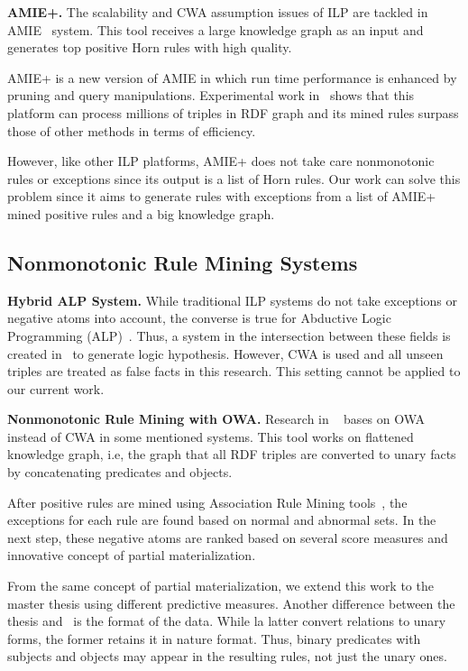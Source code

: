 \textbf{AMIE+.} The scalability and CWA assumption issues of ILP are tackled in AMIE~\cite{ref10} system. This tool receives a large knowledge graph as an input and generates top positive Horn rules with high quality.

AMIE+ is a new version of AMIE in which run time performance is enhanced by pruning and query manipulations. Experimental work in~\cite{ref10} shows that this platform can process millions of triples in RDF graph and its mined rules surpass those of other methods in terms of efficiency.

However, like other ILP platforms, AMIE+ does not take care nonmonotonic rules or exceptions since its output is a list of Horn rules. Our work can solve this problem since it aims to generate rules with exceptions from a list of AMIE+ mined positive rules and a big knowledge graph.

\subsection{Nonmonotonic Rule Mining Systems}
\label{related-work-nonmonotonic-rule-mining-systems}

\textbf{Hybrid ALP System.} While traditional ILP systems do not take exceptions or negative atoms into account, the converse is true for Abductive Logic Programming (ALP)~\cite{ref11}. Thus, a system in the intersection between these fields is created in~\cite{ref11} to generate logic hypothesis. However, CWA is used and all unseen triples are treated as false facts in this research. This setting cannot be applied to our current work.

\textbf{Nonmonotonic Rule Mining with OWA.} Research in ~\cite{ref12} bases on OWA instead of CWA in some mentioned systems. This tool works on flattened knowledge graph, i.e, the graph that all RDF triples are converted to unary facts by concatenating predicates and objects.

After positive rules are mined using Association Rule Mining tools~\cite{ref13}, the exceptions for each rule are found based on normal and abnormal sets. In the next step, these negative atoms are ranked based on several score measures and innovative concept of partial materialization.

From the same concept of partial materialization, we extend this work to the master thesis using different predictive measures. Another difference between the thesis and~\cite{ref12} is the format of the data. While la latter convert relations to unary forms, the former retains it in nature format. Thus, binary predicates with subjects and objects may appear in the resulting rules, not just the unary ones.


